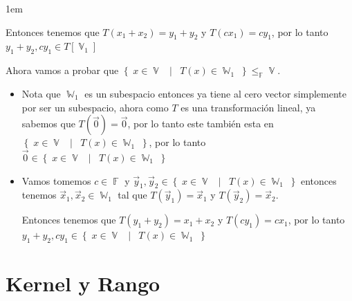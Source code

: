 \documentclass[12pt, fleqn]{report}                             %
\newenvironment{SmallIndentation}[1][0.75em]                    %
        {\begin{adjustwidth}{#1}{}\begin{footnotesize}}             %
        {\end{footnotesize}\end{adjustwidth}}                       %
\DeclareMathOperator \Space {\quad}                             %
\DeclareMathOperator \MiniSpace {\;}                            %
\newcommand \Such {\MiniSpace | \MiniSpace}                     %
\theoremstyle{break}                                            %
\DeclareMathOperator \GenericField {\mathbb{F}}                 %
\DeclareMathOperator \VectorSet    {\mathbb{V}}                 %
\DeclareMathOperator \SubVectorSet {\mathbb{W}}                 %
\newcommand{\Set}[1]    {\left\{ \; #1 \; \right\}}             %
\begin{document}
\begin{itemize}
\begin{SmallIndentation}[1em]
\begin{itemize}
                                    Entonces tenemos que $T(x_1 + x_2) = y_1 + y_2$ y $T(cx_1) = cy_1$, por lo tanto
                                    $y_1 + y_2, cy_1 \in T[\VectorSet_1]$
                            \end{itemize}

                            Ahora vamos a probar que $\Set{x \in \VectorSet \Such T(x) \in \SubVectorSet_1} 
                            \leq_{\GenericField} \VectorSet$.
                            \begin{itemize}
                                \item 
                                    Nota que $\SubVectorSet_1$ es un subespacio entonces ya tiene al cero
                                    vector simplemente por ser un subespacio, ahora como $T$ es una transformación
                                    lineal, ya sabemos que $T(\vec 0) = \vec 0$, por lo tanto este también 
                                    esta en $\Set{x \in \VectorSet \Such T(x) \in \SubVectorSet_1}$, por lo
                                    tanto $\vec 0 \in \Set{x \in \VectorSet \Such T(x) \in \SubVectorSet_1}$

                                \item
                                    Vamos tomemos $c \in \GenericField$ y 
                                    $\vec y_1, \vec y_2 \in \Set{x \in \VectorSet \Such T(x) \in \SubVectorSet_1}$
                                    entonces tenemos $\vec x_1, \vec x_2 \in \SubVectorSet_1$ tal que 
                                    $T(\vec y_1) = \vec x_1$ y $T(\vec y_2) = \vec x_2$.

                                    Entonces tenemos que $T(y_1 + y_2) = x_1 + x_2$ y $T(cy_1) = cx_1$, por lo tanto
                                    $y_1 + y_2, cy_1 \in \Set{x \in \VectorSet \Such T(x) \in \SubVectorSet_1}$
                            \end{itemize}

                        \end{SmallIndentation}
                            
                        
                \end{itemize}


        \clearpage
        \section{Kernel y Rango}
\end{document}
